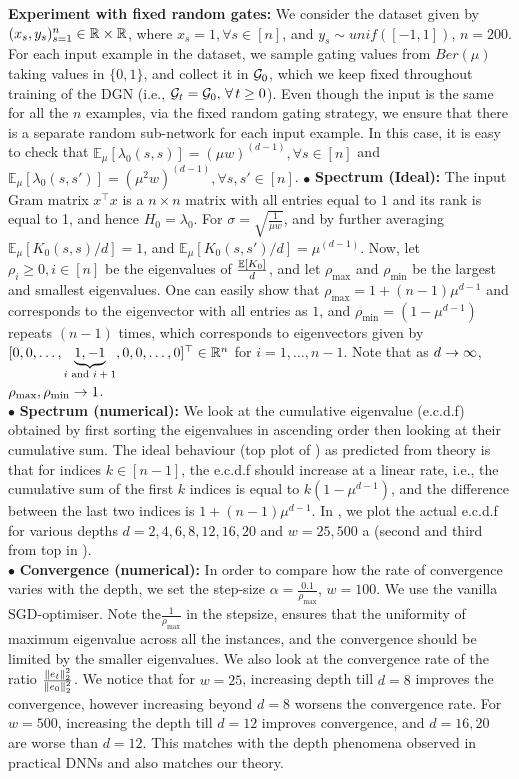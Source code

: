 \textbf{Experiment with fixed random gates:} We consider the dataset given by $(x_s,y_s)_{s=1}^n\in \mathbb{R}\times \mathbb{R}$, where $x_s=1,\forall s\in [n]$, and $y_s\sim unif([-1,1])$, $n=200$. For each input example in the dataset, we sample gating values from $Ber(\mu)$ taking values in $\{0,1\}$, and collect it in $\mathcal{G}_0$, which we keep fixed throughout training of the DGN (i.e., $\mathcal{G}_t=\mathcal{G}_0,\,\forall\,t\geq 0$).  Even though the input is the same for all the $n$ examples, via the fixed random gating strategy, we ensure that there is a separate random sub-network for each input example.  In this case, it is easy to check that $\mathbb{E}_{\mu}\left[\lambda_0(s,s)\right]=(\mu w)^{(d-1)},\forall s\in[n]$ and $\mathbb{E}_{\mu}\left[\lambda_0(s,s')\right]=(\mu^2 w)^{(d-1)},\forall s,s'\in[n]$.\WFclear
$\bullet$ \textbf{Spectrum (Ideal):} The input Gram matrix $x^\top x$ is a $n\times n$ matrix with all entries equal to $1$ and its rank is equal to 1, and hence $H_0=\lambda_0$.  For $\sigma=\sqrt{\frac{1}{\mu w}}$, and by further averaging $\mathbb{E}_{\mu}\left[K_0(s,s)/d\right]=1$, and $\mathbb{E}_{\mu}\left[K_0(s,s')/d\right]=\mu^{(d-1)}$. Now, let $\rho_i\geq 0,i \in [n]$ be the eigenvalues of $\frac{\mathbb{E}\left[K_0\right]}{d}$, and let $\rho_{\max}$ and $\rho_{\min}$ be the largest and smallest eigenvalues.  One can easily show that $\rho_{\max}=1+(n-1)\mu^{d-1}$ and corresponds to the eigenvector with all entries as $1$, and $\rho_{\min}=(1-\mu^{d-1})$ repeats $(n-1)$ times,  which corresponds to eigenvectors given by $[0, 0, \ldots, \underbrace{1, -1}_{\text{$i$ and $i+1$}}, 0,0,\ldots, 0]^\top \in \mathbb{R}^n$ for $i=1,\ldots,n-1$. Note that as $d\rightarrow\infty$, $\rho_{\max},\rho_{\min}\rightarrow 1$.\\
$\bullet$ \textbf{Spectrum (numerical):} We look at the cumulative eigenvalue (e.c.d.f) obtained by first sorting the eigenvalues in ascending order then looking at their cumulative sum. The ideal behaviour (top plot of ) as predicted from theory is that for indices $k\in[n-1]$, the e.c.d.f should increase at a linear rate, i.e., the cumulative sum of the first $k$ indices is equal to $k(1-\mu^{d-1})$, and the difference between the last two indices is $1+(n-1)\mu^{d-1}$. In , we plot the actual e.c.d.f for various depths $d=2,4,6,8,12,16,20$ and $w=25,500$ a (second and third from top in ). \hfill\\
$\bullet$ \textbf{Convergence (numerical):} In order to compare how the rate of convergence varies with the depth, we set the step-size $\alpha=\frac{0.1}{\rho_{\max}}$, $w=100$. We use the vanilla SGD-optimiser. Note the$ \frac{1}{\rho_{\max}}$ in the stepsize, ensures that the uniformity of maximum eigenvalue across all the instances, and the convergence should be limited by the smaller eigenvalues. We also look at the convergence rate of the ratio $\frac{\|e_t\|^2_2}{\|e_0\|^2_2}$. We notice that for $w=25$, increasing depth till $d=8$ improves the convergence, however increasing beyond $d=8$ worsens the convergence rate. For $w=500$, increasing the depth till $d=12$ improves convergence, and $d=16,20$ are worse than $d=12$.  This matches with the depth phenomena observed in practical DNNs and also matches our theory.


